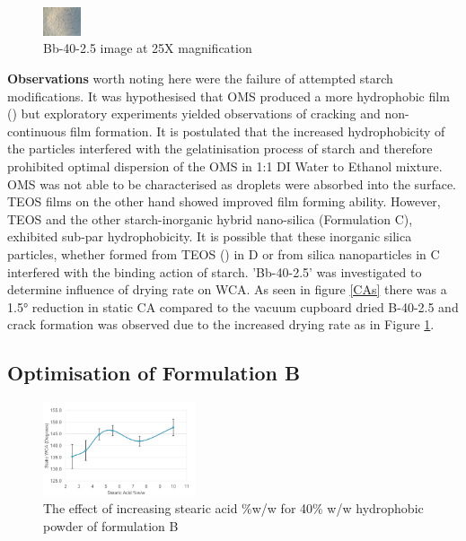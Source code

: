 \begin{figure}
\centering
    \includegraphics[width=0.1\textwidth]{Sections/Figures/WIN_20201203_13_09_29_Pro.jpg}
  \caption{Bb-40-2.5 image at 25X magnification}
  \label{Bcrack}
\end{figure}
\par \textbf{Observations} worth noting here were the failure of attempted starch modifications. It was hypothesised that OMS produced a more hydrophobic film (\cite{jiang_dai_qin_xiong_sun_2016}) but exploratory experiments yielded observations of cracking and non-continuous film formation. It is postulated that the increased hydrophobicity of the particles interfered with the gelatinisation process of starch and therefore prohibited optimal dispersion of the OMS in 1:1 DI Water to Ethanol mixture. OMS was not able to be characterised as droplets were absorbed into the surface. TEOS films on the other hand showed improved film forming ability. However, TEOS and the other starch-inorganic hybrid nano-silica (Formulation C), exhibited sub-par hydrophobicity. It is possible that these inorganic silica particles, whether formed from TEOS (\cite{TEOS}) in D or from silica nanoparticles in C interfered with the binding action of starch. 'Bb-40-2.5' was investigated to determine influence of drying rate on WCA. As seen in figure \ref{CAs} there was a 1.5° reduction in static CA compared to the vacuum cupboard dried B-40-2.5 and crack formation was observed due to the increased drying rate as in Figure \ref{Bcrack}.


\subsection{Optimisation of Formulation B}
\begin{figure}[h!]
\centering
  \includegraphics[width=0.4\textwidth]{Sections/Figures/SAOptimise.png}
  \caption{The effect of increasing stearic acid \%w/w for 40\% w/w hydrophobic powder of formulation B}\label{SAOpt}
\end{figure}

